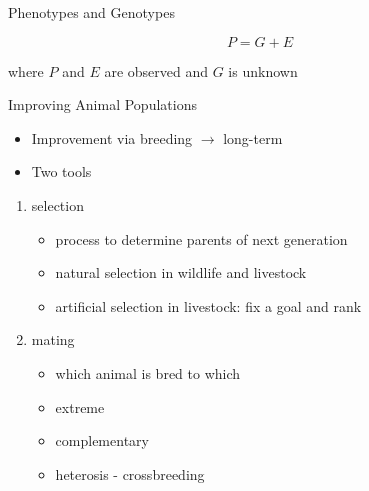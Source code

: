 \documentclass[ignorenonframetext,]{beamer}
\providecommand{\tightlist}{%
  \setlength{\itemsep}{0pt}\setlength{\parskip}{0pt}}
\begin{document}
\begin{frame}{Phenotypes and Genotypes}
\protect\hypertarget{phenotypes-and-genotypes}{}

\[
P = G + E
\]

where \(P\) and \(E\) are observed and \(G\) is unknown


\end{frame}

\begin{frame}{Improving Animal Populations}
\protect\hypertarget{improving-animal-populations}{}

\begin{itemize}
\tightlist
\item
  Improvement via breeding \(\rightarrow\) long-term
\item
  Two tools
\end{itemize}

\begin{enumerate}
\tightlist
\item
  selection

  \begin{itemize}
  \tightlist
  \item
    process to determine parents of next generation
  \item
    natural selection in wildlife and livestock
  \item
    artificial selection in livestock: fix a goal and rank
  \end{itemize}
\item
  mating

  \begin{itemize}
  \tightlist
  \item
    which animal is bred to which
  \item
    extreme
  \item
    complementary
  \item
    heterosis - crossbreeding
  \end{itemize}
\end{enumerate}


\end{frame}
\end{document}
